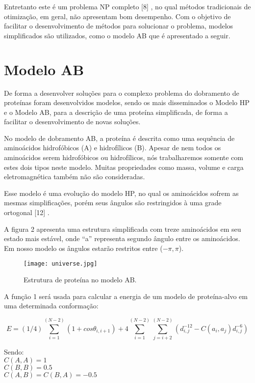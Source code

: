 \documentclass[dm,ppgcomp]{texfurg}
\begin{document}
Entretanto este é um problema NP completo [8] , no qual métodos tradicionais de otimização, em geral, não apresentam bom desempenho. Com o objetivo de facilitar o desenvolvimento de métodos para solucionar o problema, modelos simplificados são utilizados, como o modelo AB que é apresentado a seguir.

\chapter{Modelo AB}

De forma a desenvolver soluções para o complexo problema do dobramento de proteínas foram desenvolvidos modelos, sendo os mais disseminados o Modelo HP e o Modelo AB, para a descrição de uma proteína simplificada, de forma a facilitar o desenvolvimento de novas soluções. 

No modelo de dobramento AB, a proteína é descrita como uma sequência de aminoácidos hidrofóbicos (A) e hidrofílicos (B). Apesar de nem todos os aminoácidos serem hidrofóbicos ou hidrofílicos, nós trabalharemos somente com estes dois tipos neste modelo. Muitas propriedades como massa, volume e carga eletromagnética também não são consideradas. 

Esse modelo é uma evolução do modelo HP, no qual os aminoácidos sofrem as mesmas simplificações, porém seus ângulos são restringidos à uma grade ortogonal [12] . 

A figura 2 apresenta uma estrutura simplificada com treze aminoácidos em seu estado mais estável, onde “a” representa segundo ângulo entre os aminoácidos. Em nosso modelo os ângulos estarão restritos entre ($-\pi, \pi$). 

\begin{figure}[htbp]
  \centering \texttt{[image: universe.jpg]}
\caption{Estrutura de proteína no modelo AB.} 
\label{figura3}
\end{figure}

A função 1 será usada para calcular a energia de um modelo de proteína-alvo em uma determinada conformação:

\[
E=(1/4)\sum_{i=1}^{(N-2)}(1+cos\theta_{i, i+1})+4\sum_{i=1}^{(N-2)}\sum_{j=i+2}^{(N-2)}(d^{-12}_{i, j}-C (a_{i}, a_{j})d^{-6}_{i, j})
\]

Sendo:\\
$C (A, A) = 1$\\
$C (B, B) = 0.5$\\
$C (A, B) = C (B, A) = -0.5$\\
\end{document}
